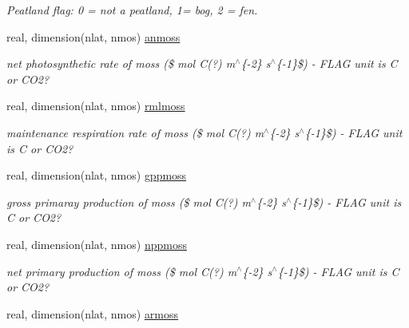\begin{DoxyCompactItemize}
\begin{DoxyCompactList}\small\item\em Peatland flag\+: 0 = not a peatland, 1= bog, 2 = fen. \end{DoxyCompactList}\item 
\hypertarget{structctem__statevars_1_1veg__rot_a9ef53574282335e75956bc2899f47468}{}real, dimension(nlat, nmos) \hyperlink{structctem__statevars_1_1veg__rot_a9ef53574282335e75956bc2899f47468}{anmoss}\label{structctem__statevars_1_1veg__rot_a9ef53574282335e75956bc2899f47468}

\begin{DoxyCompactList}\small\item\em net photosynthetic rate of moss (\$ mol C(?) m$^\wedge$\{-\/2\} s$^\wedge$\{-\/1\}\$) -\/ F\+L\+A\+G unit is C or C\+O2? \end{DoxyCompactList}\item 
\hypertarget{structctem__statevars_1_1veg__rot_a9560d1e17f435c07ac6e3719d933f4bf}{}real, dimension(nlat, nmos) \hyperlink{structctem__statevars_1_1veg__rot_a9560d1e17f435c07ac6e3719d933f4bf}{rmlmoss}\label{structctem__statevars_1_1veg__rot_a9560d1e17f435c07ac6e3719d933f4bf}

\begin{DoxyCompactList}\small\item\em maintenance respiration rate of moss (\$ mol C(?) m$^\wedge$\{-\/2\} s$^\wedge$\{-\/1\}\$) -\/ F\+L\+A\+G unit is C or C\+O2? \end{DoxyCompactList}\item 
\hypertarget{structctem__statevars_1_1veg__rot_a66b01806864cdb443aa1450bee82c350}{}real, dimension(nlat, nmos) \hyperlink{structctem__statevars_1_1veg__rot_a66b01806864cdb443aa1450bee82c350}{gppmoss}\label{structctem__statevars_1_1veg__rot_a66b01806864cdb443aa1450bee82c350}

\begin{DoxyCompactList}\small\item\em gross primaray production of moss (\$ mol C(?) m$^\wedge$\{-\/2\} s$^\wedge$\{-\/1\}\$) -\/ F\+L\+A\+G unit is C or C\+O2? \end{DoxyCompactList}\item 
\hypertarget{structctem__statevars_1_1veg__rot_acf50ec8d43f20d7b9ad9d5bdc0e8cbda}{}real, dimension(nlat, nmos) \hyperlink{structctem__statevars_1_1veg__rot_acf50ec8d43f20d7b9ad9d5bdc0e8cbda}{nppmoss}\label{structctem__statevars_1_1veg__rot_acf50ec8d43f20d7b9ad9d5bdc0e8cbda}

\begin{DoxyCompactList}\small\item\em net primary production of moss (\$ mol C(?) m$^\wedge$\{-\/2\} s$^\wedge$\{-\/1\}\$) -\/ F\+L\+A\+G unit is C or C\+O2? \end{DoxyCompactList}\item 
\hypertarget{structctem__statevars_1_1veg__rot_afa2d0bf60ea333b0f23e81c6d78186b7}{}real, dimension(nlat, nmos) \hyperlink{structctem__statevars_1_1veg__rot_afa2d0bf60ea333b0f23e81c6d78186b7}{armoss}\label{structctem__statevars_1_1veg__rot_afa2d0bf60ea333b0f23e81c6d78186b7}


\end{DoxyCompactItemize}
